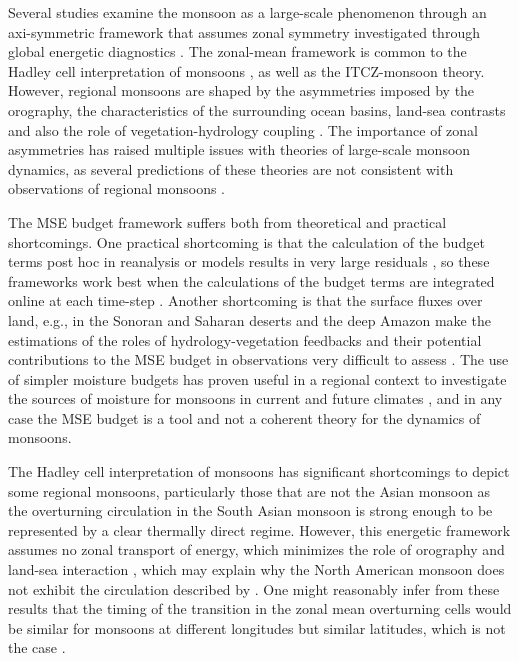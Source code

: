 Several studies examine the monsoon as a large-scale phenomenon through an axi-symmetric framework that assumes zonal symmetry investigated through global energetic diagnostics \citep[e.g.][]{faulk2017effects,geen2019,byrne2020}. The zonal-mean framework is common to the Hadley cell interpretation of monsoons \citep{bordoni2008monsoons}, as well as the ITCZ-monsoon theory. %
However, regional monsoons are shaped by the asymmetries imposed by the orography, the characteristics of the surrounding ocean basins, land-sea contrasts and also the role of vegetation-hydrology coupling \citep{wang2017,pascale2019}. 
The importance of zonal asymmetries has raised multiple issues with theories of large-scale monsoon dynamics, as several predictions of these theories are not consistent with observations of regional monsoons \citep[e.g.][]{nie2010observational,smyth2018simulated,biasutti2018global,pascale2019}. 


 The MSE budget framework suffers both from theoretical and practical shortcomings. One practical shortcoming is that the calculation of the budget terms post hoc in reanalysis or models results in very large residuals \citep{hill2019}, so these frameworks work best when the calculations of the budget terms are integrated online at each time-step \citep[e.g.][]{ma2019}.
Another shortcoming is that the surface fluxes over land, e.g., in the Sonoran and Saharan deserts and the deep Amazon make the estimations of the roles of hydrology-vegetation feedbacks and their potential contributions to the MSE budget in observations very difficult to assess \citep{boos2016,pascale2019}. The use of simpler moisture budgets has proven useful in a regional context to investigate the sources of moisture for monsoons in current  \citep{ordonez2019,martinez2019} and future climates \citep{smyth2020}, and in any case the MSE budget is a tool and not a coherent theory for the dynamics of monsoons.

The Hadley cell interpretation of monsoons has significant shortcomings to depict some regional monsoons, particularly those that are not the Asian monsoon as the overturning circulation in the South Asian monsoon is strong enough to be represented by a clear thermally direct regime.
However, this energetic framework assumes no zonal transport of energy, which minimizes the role of orography and land-sea interaction \citep{biasutti2018global}, which may explain why the North American monsoon does not exhibit the circulation described by \cite{bordoni2008monsoons}.
One might reasonably infer from these results that the timing of the transition in the zonal mean overturning cells would be similar for monsoons at different longitudes but similar latitudes, which is not the case \citep{wang2017}.

